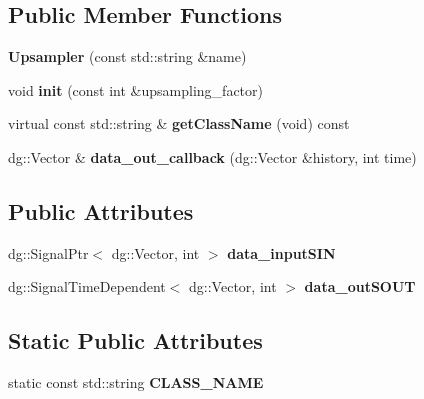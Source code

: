 \subsection*{Public Member Functions}
\begin{DoxyCompactItemize}
\item 
{\bfseries Upsampler} (const std\+::string \&name)\hypertarget{classdg__tools_1_1Upsampler_a34ed837b2a5e74ac438b1dabddc694cb}{}\label{classdg__tools_1_1Upsampler_a34ed837b2a5e74ac438b1dabddc694cb}

\item 
void {\bfseries init} (const int \&upsampling\+\_\+factor)\hypertarget{classdg__tools_1_1Upsampler_a5464f7f3d43870ffae21e6fc3ca14bb0}{}\label{classdg__tools_1_1Upsampler_a5464f7f3d43870ffae21e6fc3ca14bb0}

\item 
virtual const std\+::string \& {\bfseries get\+Class\+Name} (void) const \hypertarget{classdg__tools_1_1Upsampler_ac6a7577ec4ad2d1692c238b04655f644}{}\label{classdg__tools_1_1Upsampler_ac6a7577ec4ad2d1692c238b04655f644}

\item 
dg\+::\+Vector \& {\bfseries data\+\_\+out\+\_\+callback} (dg\+::\+Vector \&history, int time)\hypertarget{classdg__tools_1_1Upsampler_a8136079012a13ec172f1084bc147a5b7}{}\label{classdg__tools_1_1Upsampler_a8136079012a13ec172f1084bc147a5b7}

\end{DoxyCompactItemize}
\subsection*{Public Attributes}
\begin{DoxyCompactItemize}
\item 
dg\+::\+Signal\+Ptr$<$ dg\+::\+Vector, int $>$ {\bfseries data\+\_\+input\+S\+IN}\hypertarget{classdg__tools_1_1Upsampler_a52151bf7e4b2c60e290f7954b73aa2d4}{}\label{classdg__tools_1_1Upsampler_a52151bf7e4b2c60e290f7954b73aa2d4}

\item 
dg\+::\+Signal\+Time\+Dependent$<$ dg\+::\+Vector, int $>$ {\bfseries data\+\_\+out\+S\+O\+UT}\hypertarget{classdg__tools_1_1Upsampler_ac24d33450123b89763b6f22ee8432df8}{}\label{classdg__tools_1_1Upsampler_ac24d33450123b89763b6f22ee8432df8}

\end{DoxyCompactItemize}
\subsection*{Static Public Attributes}
\begin{DoxyCompactItemize}
\item 
static const std\+::string {\bfseries C\+L\+A\+S\+S\+\_\+\+N\+A\+ME}\hypertarget{classdg__tools_1_1Upsampler_ae8457eb186d7a4366014c98513982c65}{}\label{classdg__tools_1_1Upsampler_ae8457eb186d7a4366014c98513982c65}

\end{DoxyCompactItemize}
